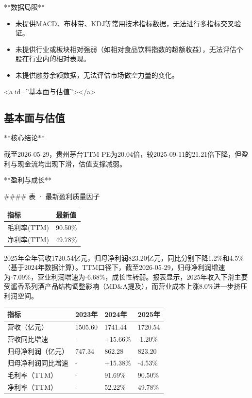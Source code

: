 \documentclass[12pt,a4paper]{article}
\begin{document}
**数据局限**

\begin{itemize}
\item 未提供MACD、布林带、KDJ等常用技术指标数据，无法进行多指标交叉验证。
\item 未提供行业或板块相对强弱（如相对食品饮料指数的超额收益），无法评估个股在行业内的相对表现。
\item 未提供融券余额数据，无法评估市场做空力量的变化。
\end{itemize}

<a id=''基本面与估值''></a>

\subsection{ 基本面与估值}

**核心结论**

截至2026-05-29，贵州茅台TTM PE为20.04倍，较2025-09-11的21.21倍下降，但盈利与现金流均出现下滑，估值支撑减弱。

**盈利与成长**

\#\#\#\# 表 · 最新盈利质量因子

\begin{table}[htbp]
\centering
\begin{tabular}{ll}
\toprule
指标 & 最新值 \\
\midrule
毛利率(TTM) & 90.50\% \\
净利率(TTM) & 49.78\% \\
\bottomrule
\end{tabular}
\end{table}


2025年全年营收1720.54亿元，归母净利润823.20亿元，同比分别下降1.2\%和4.5\%（基于2024年数据计算）。TTM口径下，截至2026-05-29，归母净利润增速为-7.09\%，营业利润增速为-6.68\%，成长性转弱。报表显示，2025年收入下滑主要受酱香系列酒产品结构调整影响（MD\&A提及），而营业成本上涨8.0\%进一步挤压利润空间。

\begin{table}[htbp]
\centering
\begin{tabular}{llll}
\toprule
指标 & 2023年 & 2024年 & 2025年 \\
\midrule
营收（亿元） & 1505.60 & 1741.44 & 1720.54 \\
营收同比增速 & - & +15.66\% & -1.20\% \\
归母净利润（亿元） & 747.34 & 862.28 & 823.20 \\
归母净利润同比增速 & - & +15.38\% & -4.53\% \\
毛利率（TTM） & - & 91.69\% & 90.50\% \\
净利率（TTM） & - & 52.22\% & 49.78\% \\
\bottomrule
\end{tabular}
\end{table}
\end{document}
